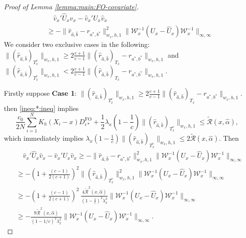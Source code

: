 \documentclass[10pt,a4paper]{amsart}
\begin{document}
\begin{proof}[Proof of Lemma \ref{lemma:main:FO-covariate}]
\begin{equation}\label{eq:holder}
\begin{array}{rl}
&\quad\displaystyle\hat v_x'\hat U_x \hat v_x  - \hat v_x' U_x \hat v_x\\
&\displaystyle\geq \! - \|\hat r_{\hat a,\hat b} - r_{a^*,b^*}\|_{w_x,h,1}^2 \! \|\mathcal{W}_x^{-1}\!(U_x-\hat U_x)\!\mathcal{W}_x^{-1}\|_{\infty,\infty}
\end{array}
\end{equation}
We consider two exclusive cases in the following: $\|(\hat r_{\hat a,\hat b})_{T_x^c}\|_{w_x,h,1} \geq 2\frac{c+1}{c-1}\|(\hat r_{\hat a,\hat b})_{T_x} - r_{a^*,b^*}\|_{w_x,h,1}$ and $\|(\hat r_{\hat a,\hat b})_{T_x^c}\|_{w_x,h,1} < 2\frac{c+1}{c-1}\|(\hat r_{\hat a,\hat b})_{T_x} - r_{a^*,b^*}\|_{w_x,h,1}$. 

Firstly suppose \textbf{Case 1}: $\|(\hat r_{\hat a,\hat b})_{T_x^c}\|_{w_x,h,1} \geq 2\frac{c+1}{c-1}\|(\hat r_{\hat a,\hat b})_{T_x} - r_{a^*,b^*}\|_{w_x,h,1}$.
then \eqref{ineq:*:ineq} implies 
$$\frac{c_0}{2N}\sum_{i=1}^NK_h(X_i-x)D_{i*}^{\mathrm{FO}} + \frac{1}{2}\lambda_x\left(1-\frac{1}{c}\right)\|(\hat r_{\hat a,\hat b})_{T^c_x}\|_{w_x,h,1}\leq\widetilde{\mathcal{R}}(x,\hat\alpha),$$ 
which immediately implies $\lambda_x\left(1-\frac{1}{c}\right)\|(\hat r_{\hat a,\hat b})_{T^c_x}\|_{w_x,h,1}\leq2\widetilde{\mathcal{R}}(x,\hat\alpha)$. Then 
$$\begin{array}{rl}
&\quad\displaystyle\hat v_x'\hat U_x \hat v_x  - \hat v_x' U_x \hat v_x \geq  - \|\hat r_{\hat a,\hat b} - r_{a^*,b^*}\|_{w_x,h,1}^2  \|\mathcal{W}_x^{-1}(U_x-\hat U_x)\mathcal{W}_x^{-1}\|_{\infty,\infty}\\
&\displaystyle\geq  - \left(1+\frac{(c-1)}{2(c+1)}\right)^2\| (\hat r_{\hat a, \hat b})_{T_x^c}\|_{w_x,h,1}^2 \|\mathcal{W}_x^{-1}(U_x-\hat U_x)\mathcal{W}_x^{-1}\|_{\infty,\infty}\\
&\displaystyle\geq-\left(1+\frac{(c-1)}{2(c+1)}\right)^2\ \frac{4\widetilde{\mathcal{R}}^2(x,\hat\alpha)}{(1-\frac{1}{c})^2\lambda^2_x}  \|\mathcal{W}_x^{-1}(U_x-\hat U_x)\mathcal{W}_x^{-1}\|_{\infty,\infty}\\
&\displaystyle\geq-\frac{9\widetilde{\mathcal{R}}^2(x,\hat\alpha)}{(1-1/c)^2\lambda_x^2}\|\mathcal{W}_x^{-1}(U_x-\hat U_x)\mathcal{W}_x^{-1}\|_{\infty,\infty}.
\end{array}$$

\end{proof}
\end{document}
